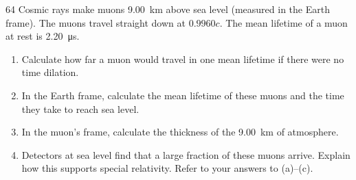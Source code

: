 \begin{practiceq}{6}{4}\label{pq:muons}
Cosmic rays make muons \qty{9.00}{km} above sea level (measured in the Earth frame). The muons
travel straight down at $0.9960c$. The mean lifetime of a muon at rest is
\qty{2.20}{\micro\second}.
\begin{enumerate}[label=(\alph*)]
  \item Calculate how far a muon would travel in one mean lifetime if there were no time
        dilation. 
  \item In the Earth frame, calculate the mean lifetime of these muons and the time they take
        to reach sea level. 
  \item In the muon's frame, calculate the thickness of the \qty{9.00}{km} of atmosphere.
  \item Detectors at sea level find that a large fraction of these muons arrive. Explain how
        this supports special relativity. Refer to your answers to (a)--(c). 
\end{enumerate}
\end{practiceq}


